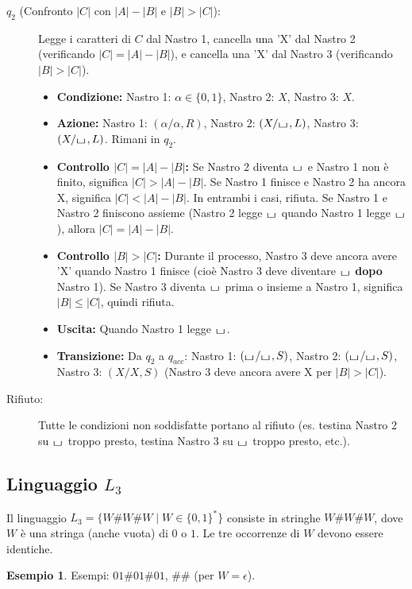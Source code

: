 \documentclass[a4paper]{article}
\theoremstyle{definition} %
\newtheorem{example}{Esempio}
\newcommand{\blankS}{\ensuremath{\raisebox{-0.15ex}{\scalebox{1.3}[0.7]{$\sqcup$}}\mkern2mu}}
\begin{document}
\begin{description}
    \item[$q_2$ (Confronto $|C|$ con $|A|-|B|$ e $|B|>|C|$):] Legge i caratteri di $C$ dal Nastro 1, cancella una 'X' dal Nastro 2 (verificando $|C|=|A|-|B|$), e cancella una 'X' dal Nastro 3 (verificando $|B|>|C|$).
    \begin{itemize}
        \item \textbf{Condizione:} Nastro 1: $\alpha \in \{0,1\}$, Nastro 2: $X$, Nastro 3: $X$.
        \item \textbf{Azione:} Nastro 1: $(\alpha/\alpha, R)$, Nastro 2: $(X/\blankS, L)$, Nastro 3: $(X/\blankS, L)$. Rimani in $q_2$.
        \item \textbf{Controllo $|C|=|A|-|B|$:} Se Nastro 2 diventa $\blankS$ e Nastro 1 non è finito, significa $|C|>|A|-|B|$. Se Nastro 1 finisce e Nastro 2 ha ancora X, significa $|C|<|A|-|B|$. In entrambi i casi, rifiuta. Se Nastro 1 e Nastro 2 finiscono assieme (Nastro 2 legge $\blankS$ quando Nastro 1 legge $\blankS$), allora $|C|=|A|-|B|$.
        \item \textbf{Controllo $|B|>|C|$:} Durante il processo, Nastro 3 deve ancora avere 'X' quando Nastro 1 finisce (cioè Nastro 3 deve diventare $\blankS$ \textbf{dopo} Nastro 1). Se Nastro 3 diventa $\blankS$ prima o insieme a Nastro 1, significa $|B| \le |C|$, quindi rifiuta.
        \item \textbf{Uscita:} Quando Nastro 1 legge $\blankS$.
        \item \textbf{Transizione:} Da $q_2$ a $q_{acc}$: Nastro 1: $(\blankS/\blankS, S)$, Nastro 2: $(\blankS/\blankS, S)$, Nastro 3: $(X/X, S)$ (Nastro 3 deve ancora avere X per $|B|>|C|$).
    \end{itemize}
    \item[Rifiuto:] Tutte le condizioni non soddisfatte portano al rifiuto (es. testina Nastro 2 su $\blankS$ troppo presto, testina Nastro 3 su $\blankS$ troppo presto, etc.).
\end{description}

\subsection{Linguaggio $L_3$}
Il linguaggio $L_3 = \{W\#W\#W \mid W \in \{0,1\}^*\}$ consiste in stringhe $W\#W\#W$, dove $W$ è una stringa (anche vuota) di $0$ o $1$. Le tre occorrenze di $W$ devono essere identiche.
\begin{example}
Esempi: $01\#01\#01$, $\#\#$ (per $W=\epsilon$).
\end{example}
\end{document}
